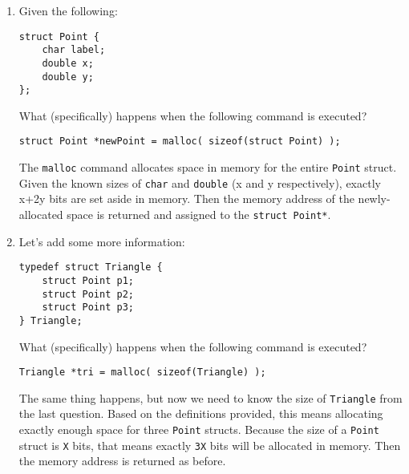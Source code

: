 \begin{enumerate}
\item Given the following:
\begin{lstlisting}[numbers=none]
struct Point {
	char label;
	double x;
	double y;
};
\end{lstlisting}

What (specifically) happens when the following command is executed?

\hspace{15mm} \texttt{struct Point *newPoint = malloc( sizeof(struct Point) );}

\begin{answer}
The \texttt{malloc} command allocates space in memory for the entire \texttt{Point} struct.
Given the known sizes of \texttt{char} and \texttt{double} (x and y respectively), exactly x+2y bits are set aside in memory.
Then the memory address of the newly-allocated space is returned and assigned to the \texttt{struct Point*}.
\end{answer}

\item Let's add some more information:
\begin{lstlisting}[numbers=none]
typedef struct Triangle {
	struct Point p1;
	struct Point p2;
	struct Point p3;
} Triangle;
\end{lstlisting}

What (specifically) happens when the following command is executed?

\hspace{15mm} \texttt{Triangle *tri = malloc( sizeof(Triangle) );}

\begin{answer}
The same thing happens, but now we need to know the size of \texttt{Triangle} from the last question.
Based on the definitions provided, this means allocating exactly enough space for three \texttt{Point} structs.
Because the size of a \texttt{Point} struct is \texttt{X} bits, that means exactly \texttt{3X} bits will be allocated in memory.
Then the memory address is returned as before.
\end{answer}
\end{enumerate}